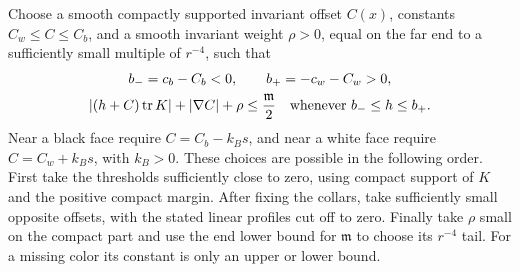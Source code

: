 Choose a smooth compactly supported invariant offset $C(x)$, constants
$C_w\le C\le C_b$, and a smooth invariant weight $\rho>0$, equal on
the far end to a sufficiently small multiple of $r^{-4}$, such that
\begin{gather}\label{d:assigned-heights}
 b_-=c_b-C_b<0,\qquad b_+=-c_w-C_w>0,\\
 |(h+C)\operatorname{tr} K|+|\nabla C|+\rho\le\frac{\mathfrak m}{2}
 \quad\text{whenever }b_-\le h\le b_+.
 \label{d:offset-margin}
\end{gather}
Near a black face require $C=C_b-k_Bs$, and near a white face require
$C=C_w+k_Bs$, with $k_B>0$.  These choices are possible in the
following order.  First take the thresholds sufficiently close to
zero, using compact support of $K$ and the positive compact margin.
After fixing the collars, take sufficiently small opposite offsets,
with the stated linear profiles cut off to zero.  Finally take
$\rho$ small on the compact part and use the end lower bound for
$\mathfrak m$ to choose its $r^{-4}$ tail.  For a missing color its
constant is only an upper or lower bound.

